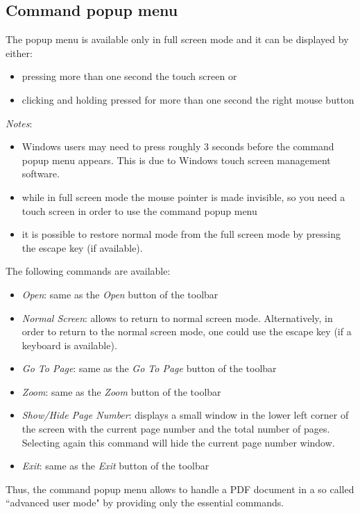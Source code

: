 \documentclass[journal,12pt]{IEEEtran}
\begin{document}
\subsection{Command popup menu}
The popup menu is available only in full screen mode and it can be displayed by either:
\begin{itemize}
 \item pressing more than one second the touch screen or
 \item clicking and holding pressed for more than one second the right mouse button
\end{itemize}

\textit{Notes}: 
\begin{itemize}
 \item Windows users may need to press roughly 3 seconds before the command popup menu appears. This is due to Windows touch screen management software.
 \item while in full screen mode the mouse pointer is made invisible, so you need a touch screen in order to use the command popup menu
 \item it is possible to restore normal mode from the full screen mode by pressing the escape key (if available).
\end{itemize}

The following commands are available:
\begin{itemize}
 \item \textit{Open}: same as the \textit{Open} button of the toolbar
\item \textit{Normal Screen}: allows to return to normal screen mode. Alternatively, in order to return to the normal screen mode, one could use the escape key (if a keyboard is available).
 \item \textit{Go To Page}: same as the \textit{Go To Page} button of the toolbar
 \item \textit{Zoom}: same as the \textit{Zoom} button of the toolbar
 \item \textit{Show/Hide Page Number}: displays a small window in the lower left corner of the screen with the current page number and the total number of pages. Selecting again this command will hide the current page number window.
 \item \textit{Exit}: same as the \textit{Exit} button of the toolbar
\end{itemize}
Thus, the command popup menu allows to handle a PDF document in a so called ``advanced user mode" by providing only the essential commands.
\end{document}

